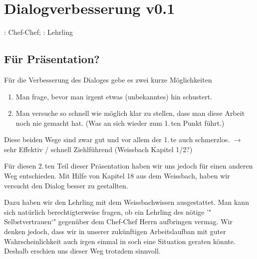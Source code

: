 \section{Dialogverbesserung v0.1}
\herrcc: Chef-Chef; \herrl: Lehrling\\

\subsection{Für Präsentation?}
Für die Verbesserung des Dialoges gebe es zwei kurze Möglichkeiten
\begin{enumerate}
  \item Man frage, bevor man irgent etwas (unbekanntes) hin schustert.
  \item Man versuche so schnell wie möglich klar zu stellen,
          dass man diese Arbeit noch nie gemacht hat. (Was an sich wieder
          zum 1.\,ten Punkt führt.)
\end{enumerate}

Diese beiden Wege sind zwar gut und vor allem der 1.\,te auch schmerzlos.
$\rightarrow$ sehr Effektiv / schnell Ziehlführend (Weissbach Kapitel 1/2?)

Für diesen 2.\,ten Teil dieser Präsentation haben wir uns jedoch für einen anderen
Weg entschieden.  Mit Hilfe von Kapitel 18 aus dem Weissbach, haben wir versucht
den Dialog besser zu gestallten.

Dazu haben wir den Lehrling \herrl mit dem Weissbachwissen ausgestattet.  Man kann
sich natürlich berechtigterweise fragen, ob ein Lehrling des nötige '" Selbstvertrauen`"
gegenüber dem Chef-Chef Herrn \herrcc aufbringen vermag.  Wir denken jedoch, dass wir
in unserer zukünftigen Arbeitslaufban mit guter Wahrscheinlichkeit auch irgen einmal
in soch eine Situation geraten könnte. Deshalb erschien uns dieser Weg trotzdem sinnvoll.

